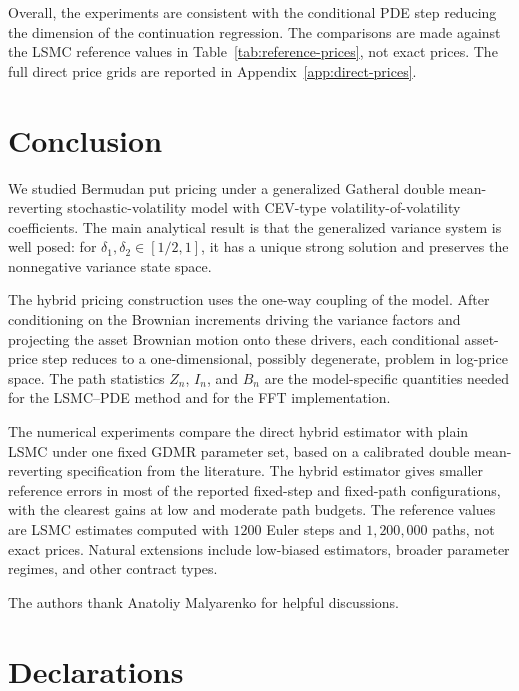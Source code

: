 \documentclass[pdflatex,sn-mathphys-num]{sn-jnl}
\theoremstyle{thmstyleone}%
\theoremstyle{thmstylethree}%
\theoremstyle{thmstyletwo}%
\begin{document}
\FloatBarrier

Overall, the experiments are consistent with the conditional PDE step reducing
the dimension of the continuation regression. The comparisons are
made against the LSMC reference values in Table~\ref{tab:reference-prices}, not exact prices. The full direct
price grids are reported in Appendix~\ref{app:direct-prices}.

\section{Conclusion}\label{sec:conclusion}

We studied Bermudan put pricing under a generalized Gatheral double
mean-reverting stochastic-volatility model with CEV-type
volatility-of-volatility coefficients. The main analytical result is that the
generalized variance system is well posed: for
$\delta_1,\delta_2\in[1/2,1]$, it has a unique strong solution and preserves
the nonnegative variance state space.

The hybrid pricing construction uses the one-way coupling of the model. After
conditioning on the Brownian increments driving the variance factors and
projecting the asset Brownian motion onto these drivers, each conditional
asset-price step reduces to a one-dimensional, possibly degenerate, problem in
log-price space. The path statistics $Z_n$, $I_n$, and $B_n$ are the
model-specific quantities
needed for the LSMC--PDE method and for the FFT implementation.

The numerical experiments compare the direct hybrid estimator with plain LSMC
under one fixed GDMR parameter set, based on a calibrated double mean-reverting
specification from the literature. The hybrid estimator gives smaller reference
errors in most of the reported fixed-step and fixed-path configurations, with
the clearest gains at low and moderate path budgets. The reference values are
LSMC estimates computed with $1200$ Euler steps and $1{,}200{,}000$ paths,
not exact prices. Natural extensions include low-biased estimators, broader
parameter regimes, and other contract types.



\backmatter

The authors thank Anatoliy Malyarenko for helpful discussions.

\section*{Declarations}
\end{document}
